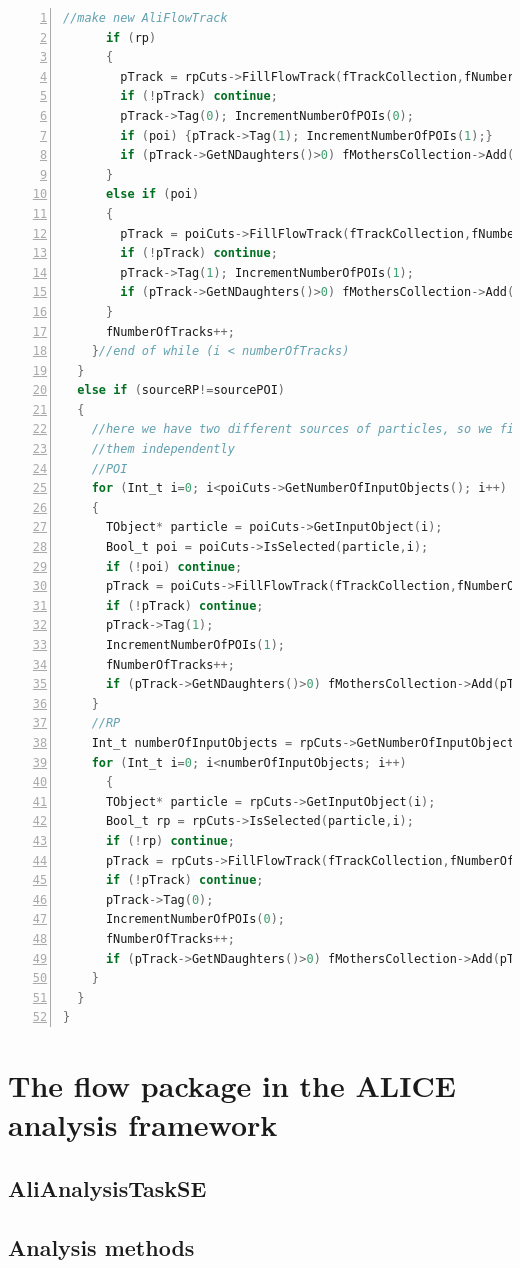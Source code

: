 \documentclass[a4paper]{book}
\numberwithin{equation}{subsection}
\begin{document}
\begin{lstlisting}[language=C, numbers=left]
      //make new AliFlowTrack
      if (rp)
      {
        pTrack = rpCuts->FillFlowTrack(fTrackCollection,fNumberOfTracks);
        if (!pTrack) continue;
        pTrack->Tag(0); IncrementNumberOfPOIs(0);
        if (poi) {pTrack->Tag(1); IncrementNumberOfPOIs(1);}
        if (pTrack->GetNDaughters()>0) fMothersCollection->Add(pTrack);
      }
      else if (poi)
      {
        pTrack = poiCuts->FillFlowTrack(fTrackCollection,fNumberOfTracks);
        if (!pTrack) continue;
        pTrack->Tag(1); IncrementNumberOfPOIs(1);
        if (pTrack->GetNDaughters()>0) fMothersCollection->Add(pTrack);
      }
      fNumberOfTracks++;
    }//end of while (i < numberOfTracks)
  }
  else if (sourceRP!=sourcePOI)
  {
    //here we have two different sources of particles, so we fill
    //them independently
    //POI
    for (Int_t i=0; i<poiCuts->GetNumberOfInputObjects(); i++)
    {
      TObject* particle = poiCuts->GetInputObject(i);
      Bool_t poi = poiCuts->IsSelected(particle,i);
      if (!poi) continue;
      pTrack = poiCuts->FillFlowTrack(fTrackCollection,fNumberOfTracks);
      if (!pTrack) continue;
      pTrack->Tag(1);
      IncrementNumberOfPOIs(1);
      fNumberOfTracks++;
      if (pTrack->GetNDaughters()>0) fMothersCollection->Add(pTrack);
    }
    //RP
    Int_t numberOfInputObjects = rpCuts->GetNumberOfInputObjects();
    for (Int_t i=0; i<numberOfInputObjects; i++)
      {
      TObject* particle = rpCuts->GetInputObject(i);
      Bool_t rp = rpCuts->IsSelected(particle,i);
      if (!rp) continue;
      pTrack = rpCuts->FillFlowTrack(fTrackCollection,fNumberOfTracks);
      if (!pTrack) continue;
      pTrack->Tag(0);
      IncrementNumberOfPOIs(0);
      fNumberOfTracks++;
      if (pTrack->GetNDaughters()>0) fMothersCollection->Add(pTrack);
    }
  }
}\end{lstlisting}

\section{The flow package in the ALICE analysis framework}
\subsection{AliAnalysisTaskSE}
\subsection{Analysis methods}
\end{document}

